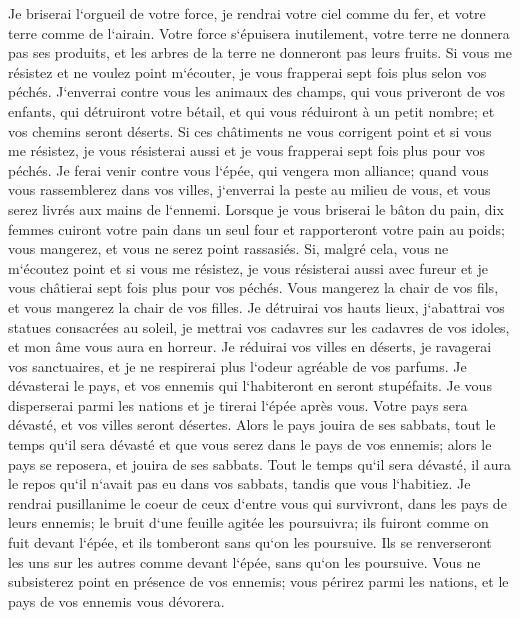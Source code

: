 \verse Je briserai l`orgueil de votre force, je rendrai votre ciel comme du fer, et votre terre comme de l`airain. 
\verse Votre force s`épuisera inutilement, votre terre ne donnera pas ses produits, et les arbres de la terre ne donneront pas leurs fruits. 
\verse Si vous me résistez et ne voulez point m`écouter, je vous frapperai sept fois plus selon vos péchés. 
\verse J`enverrai contre vous les animaux des champs, qui vous priveront de vos enfants, qui détruiront votre bétail, et qui vous réduiront à un petit nombre; et vos chemins seront déserts. 
\verse Si ces châtiments ne vous corrigent point et si vous me résistez, 
\verse je vous résisterai aussi et je vous frapperai sept fois plus pour vos péchés. 
\verse Je ferai venir contre vous l`épée, qui vengera mon alliance; quand vous vous rassemblerez dans vos villes, j`enverrai la peste au milieu de vous, et vous serez livrés aux mains de l`ennemi. 
\verse Lorsque je vous briserai le bâton du pain, dix femmes cuiront votre pain dans un seul four et rapporteront votre pain au poids; vous mangerez, et vous ne serez point rassasiés. 
\verse Si, malgré cela, vous ne m`écoutez point et si vous me résistez, 
\verse je vous résisterai aussi avec fureur et je vous châtierai sept fois plus pour vos péchés. 
\verse Vous mangerez la chair de vos fils, et vous mangerez la chair de vos filles. 
\verse Je détruirai vos hauts lieux, j`abattrai vos statues consacrées au soleil, je mettrai vos cadavres sur les cadavres de vos idoles, et mon âme vous aura en horreur. 
\verse Je réduirai vos villes en déserts, je ravagerai vos sanctuaires, et je ne respirerai plus l`odeur agréable de vos parfums. 
\verse Je dévasterai le pays, et vos ennemis qui l`habiteront en seront stupéfaits. 
\verse Je vous disperserai parmi les nations et je tirerai l`épée après vous. Votre pays sera dévasté, et vos villes seront désertes. 
\verse Alors le pays jouira de ses sabbats, tout le temps qu`il sera dévasté et que vous serez dans le pays de vos ennemis; alors le pays se reposera, et jouira de ses sabbats. 
\verse Tout le temps qu`il sera dévasté, il aura le repos qu`il n`avait pas eu dans vos sabbats, tandis que vous l`habitiez. 
\verse Je rendrai pusillanime le coeur de ceux d`entre vous qui survivront, dans les pays de leurs ennemis; le bruit d`une feuille agitée les poursuivra; ils fuiront comme on fuit devant l`épée, et ils tomberont sans qu`on les poursuive. 
\verse Ils se renverseront les uns sur les autres comme devant l`épée, sans qu`on les poursuive. Vous ne subsisterez point en présence de vos ennemis; 
\verse vous périrez parmi les nations, et le pays de vos ennemis vous dévorera. 
